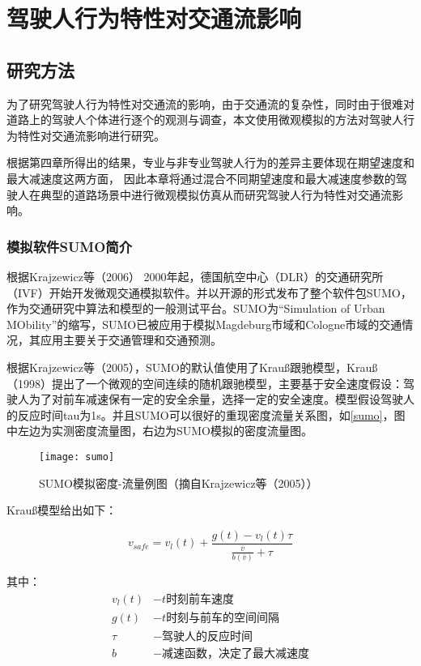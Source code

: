 \chapter{驾驶人行为特性对交通流影响}
\section{研究方法}
为了研究驾驶人行为特性对交通流的影响，由于交通流的复杂性，同时由于很难对道路上的驾驶人个体进行逐个的观测与调查，本文使用微观模拟的方法对驾驶人行为特性对交通流影响进行研究。

根据第四章所得出的结果，专业与非专业驾驶人行为的差异主要体现在期望速度和最大减速度这两方面， 因此本章将通过混合不同期望速度和最大减速度参数的驾驶人在典型的道路场景中进行微观模拟仿真从而研究驾驶人行为特性对交通流影响。
\subsection{模拟软件SUMO简介}

根据Krajzewicz等（2006）\cite{Krajzewicz2006}
2000年起，德国航空中心（DLR）的交通研究所（IVF）开始开发微观交通模拟软件。并以开源的形式发布了整个软件包SUMO，作为交通研究中算法和模型的一般测试平台。SUMO为“Simulation of Urban MObility”的缩写，SUMO已被应用于模拟Magdeburg市域和Cologne市域的交通情况，其应用主要关于交通管理和交通预测。

根据Krajzewicz等（2005）\cite{Krajzewicz2005}，SUMO的默认值使用了Krauß跟驰模型，Krauß（1998）\cite{Krauss1998}提出了一个微观的空间连续的随机跟驰模型，主要基于安全速度假设：驾驶人为了对前车减速保有一定的安全余量，选择一定的安全速度。模型假设驾驶人的反应时间tau为1s。并且SUMO可以很好的重现密度流量关系图，如\autoref{sumo}，图中左边为实测密度流量图，右边为SUMO模拟的密度流量图。

\begin{figure}[!htb]
\begin{center}
\texttt{[image: sumo]}
\end{center}
\caption{SUMO模拟密度-流量例图（摘自Krajzewicz等（2005）\cite{Krajzewicz2005}）}
\label{sumo}
\end{figure}

Krauß模型给出如下：

\begin{equation}
v_{safe}=v_l(t)+\frac{g(t)-v_l(t)\tau}{\frac{\bar{v}}{b(\bar{v})}+\tau}
\end{equation}

其中：
\begin{displaymath}
{\begin{aligned}
v_l(t)&-t\text{时刻前车速度}\\
g(t)&-t\text{时刻与前车的空间间隔}\\
\tau&-\text{驾驶人的反应时间}\\
b&-\text{减速函数，决定了最大减速度}\\
\end{aligned}}
\end{displaymath}

